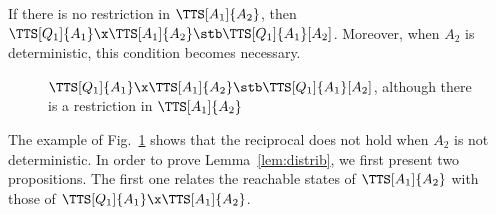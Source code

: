 \documentclass{LMCS}
\theoremstyle{plain}\newtheorem*{prop11}{Proposition~\ref{prop:states} bis}
\begin{document}
\begin{lem}\label{lem:distrib}
  If there is no restriction in $\TTS[A_1]{A_2}$, then
  $\TTS[Q_1]{A_1}\x\TTS[A_1]{A_2}\stb\TTS[Q_1]{A_1}[A_2]$.
  Moreover, when $A_2$ is deterministic, this condition becomes necessary.
\end{lem}
\begin{figure}[t]
  \centering
  \def\a{1.75}
\def\b{0.4}
\def\c{4}
  \caption[$A_2$ is non-deterministic and the reciprocal of
  Lemma~\ref{lem:distrib} does not hold.]
  {$\TTS[Q_1]{A_1}\x\TTS[A_1]{A_2}\stb\TTS[Q_1]{A_1}[A_2]$,
  although there is a restriction in $\TTS[A_1]{A_2}$\label{fig:counterex}}
\end{figure}
The example of Fig.~\ref{fig:counterex} shows that the reciprocal does not hold
when $A_2$ is not deterministic.
In order to prove Lemma~\ref{lem:distrib}, we first present two propositions.
The first one relates the reachable states of $\TTS[A_1]{A_2}$ with those of
$\TTS[Q_1]{A_1}\x\TTS[A_1]{A_2}$.
\end{document}
